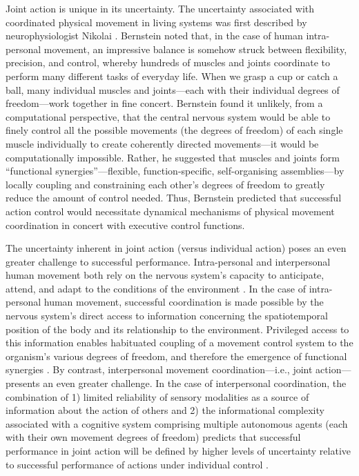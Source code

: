\begin{CJK}{UTF8}{gbsn}
Joint action is unique in its uncertainty.  The uncertainty associated with coordinated physical movement in living systems was first described by neurophysiologist Nikolai \textcite{Bernstein1967}.  Bernstein noted that, in the case of human intra-personal movement, an impressive balance is somehow struck between flexibility, precision, and control, whereby hundreds of muscles and joints coordinate to perform many different tasks of everyday life.  When we grasp a cup or catch a ball, many individual muscles and joints---each with their individual degrees of freedom---work together in fine concert.  Bernstein found it unlikely, from a computational perspective, that the central nervous system would be able to finely control all the possible movements (the degrees of freedom) of each single muscle individually to create coherently directed movements---it would be computationally impossible.  Rather, he suggested that muscles and joints form  ``functional synergies''---flexible, function-specific, self-organising assemblies---by locally coupling and constraining each other's degrees of freedom to greatly reduce the amount of control needed.  Thus, Bernstein predicted that successful action control would necessitate dynamical mechanisms of physical movement coordination in concert with executive control functions.

The uncertainty inherent in joint action (versus individual action) poses an even greater challenge to successful performance.  Intra-personal and interpersonal human movement both rely on the nervous system's capacity to anticipate, attend, and adapt to the conditions of the environment \citep{Keller2014}.  In the case of intra-personal human movement, successful coordination is made possible by the nervous system's direct access to information concerning the spatiotemporal position of the body and its relationship to the environment.  Privileged access to this information enables habituated coupling of a movement control system to the organism's various degrees of freedom, and therefore the emergence of functional synergies \citep{Riley2011}.  By contrast, interpersonal movement coordination---i.e., joint action---presents an even greater challenge.  In the case of interpersonal coordination, the combination of 1) limited reliability of sensory modalities as a source of information about the action of others \citep{Wilson2005,Wolpert2003,Frith2007} and 2) the informational complexity associated with a cognitive system comprising multiple autonomous agents (each with their own movement degrees of freedom) predicts that successful performance in joint action will be defined by higher levels of uncertainty relative to successful performance of actions under individual control \citep{Turvey1978}.


\end{CJK}
